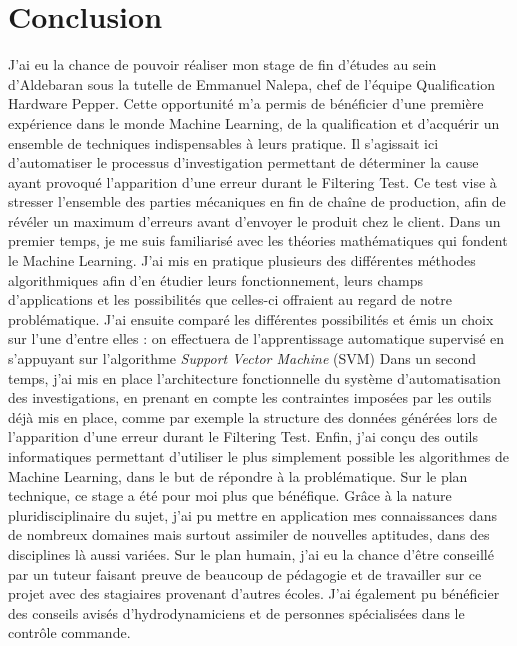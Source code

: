 \chapter{Conclusion}
\label{Conclusion}
\thispagestyle{fancy}

J'ai eu la chance de pouvoir réaliser mon stage de fin d'études au sein d'Aldebaran sous la tutelle de Emmanuel Nalepa, chef de l'équipe Qualification Hardware Pepper. Cette opportunité m'a permis de bénéficier d'une première expérience dans le monde Machine Learning, de la qualification et d'acquérir un ensemble de techniques indispensables à leurs pratique. Il s'agissait ici d'automatiser le processus d'investigation permettant de déterminer la cause ayant provoqué l'apparition d'une erreur durant le Filtering Test. Ce test vise à stresser l'ensemble des parties mécaniques en fin de chaîne de production, afin de révéler un maximum d'erreurs avant d'envoyer le produit chez le client.
\newline
\newline
Dans un premier temps, je me suis familiarisé avec les théories mathématiques qui fondent le Machine Learning. J'ai mis en pratique plusieurs des différentes méthodes algorithmiques afin d'en étudier leurs fonctionnement, leurs champs d'applications et les possibilités que celles-ci offraient au regard de notre problématique. J'ai ensuite comparé les différentes possibilités et émis un choix sur l'une d'entre elles : on effectuera de l'apprentissage automatique supervisé en s'appuyant sur l'algorithme \emph{Support Vector Machine} (SVM)
\newline
Dans un second temps, j'ai mis en place l'architecture fonctionnelle du système d'automatisation des investigations, en prenant en compte les contraintes imposées par les outils déjà mis en place, comme par exemple la structure des données générées lors de l'apparition d'une erreur durant le Filtering Test. 
\newline
Enfin, j'ai conçu des outils informatiques permettant d'utiliser le plus simplement possible les algorithmes de Machine Learning, dans le but de répondre à la problématique. 
\newline
\newline
Sur le plan technique, ce stage a été pour moi plus que bénéfique. Grâce à la nature pluridisciplinaire du sujet, j’ai pu mettre en application mes connaissances dans de nombreux domaines mais surtout assimiler de nouvelles aptitudes, dans des disciplines là aussi variées. Sur le plan humain, j’ai eu la chance d’être conseillé par un tuteur faisant preuve de beaucoup de pédagogie et de travailler sur ce projet avec des stagiaires provenant d’autres écoles. J’ai également pu bénéficier des conseils avisés d’hydrodynamiciens et de personnes spécialisées dans le contrôle commande.